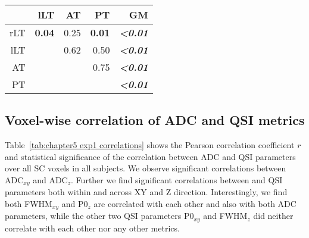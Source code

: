 \begin{table}
  {
    \begin{tabular}{rrrrr}
    \addlinespace
    \toprule
          & lLT  & AT    & PT    & GM \\
    \midrule
    rLT  & \textbf{0.04}  & 0.25  & \textbf{0.01}  & \textbf{\emph{<0.01}} \\
    lLT  &       & 0.62  & 0.50  & \textbf{\emph{<0.01}} \\
    AT    &       &       & 0.75  & \textbf{\emph{<0.01}} \\
    PT    &       &       &       & \textbf{\emph{<0.01}} \\
    \bottomrule
    \end{tabular}%
    \label{tab:chap5exp1_qsiall hotelling}%
  }
\end{table}%

\subsection{Voxel-wise correlation of ADC and QSI metrics}
Table~\ref{tab:chapter5 exp1 correlations} shows the Pearson correlation coefficient $\mathit{r}$ and statistical significance of the correlation between ADC and \gls{QSI} parameters over all \gls{SC} voxels in all subjects. We observe significant correlations between \gls{ADC}$_{xy}$ and \gls{ADC}$_z$. Further we find significant correlations between
and \gls{QSI} parameters both within and across XY and Z direction. Interestingly, we find both FWHM$_{xy}$ and P0$_z$ are correlated with each other and also with both ADC parameters, while the other two \gls{QSI} parameters P0$_{xy}$ and FWHM$_z$ did neither correlate with each other nor any other metrics.%

